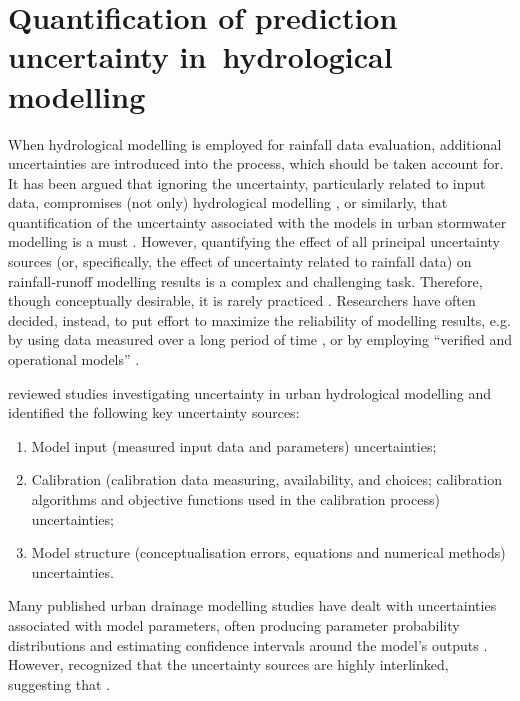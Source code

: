 \documentclass{ctuthesis}\usepackage[]{graphicx}\usepackage[]{color}
\begin{document}
\section{Quantification of prediction uncertainty in~hydrological modelling} \label{PredUncQuant}

When hydrological modelling is employed for rainfall data evaluation, additional uncertainties are introduced into the process, which should be taken account for. It has been argued that ignoring the uncertainty, particularly related to input data, compromises (not only) hydrological modelling \citep{beven2006undermining, kavetskiBayesianAnalysisInput2006}, or similarly, that quantification of the uncertainty associated with the models in urban stormwater modelling is a must \citep{dotto2012comparison}. However, quantifying the effect of all principal uncertainty sources (or, specifically, the effect of
uncertainty related to rainfall data) on rainfall‐runoff modelling results is a complex and challenging
task. Therefore, though conceptually desirable, it is rarely practiced \citep{dotto2012comparison}. Researchers have often decided, instead, to put effort to maximize the reliability of modelling results, e.g. by using data measured over a long period of time \citep{segondSignificanceSpatialRainfall2007}, or by employing “verified and operational models” \citep{ochoa-rodriguezImpactSpatialTemporal2015}.

\cite{deleticAssessingUncertaintiesUrban2012} reviewed studies investigating uncertainty in urban hydrological modelling and identified the following key uncertainty sources:
\begin{enumerate}
        \item Model input (measured input data and parameters) uncertainties;
        \item Calibration (calibration data measuring, availability, and choices; calibration algorithms and objective functions used in the calibration process) uncertainties;
        \item Model structure (conceptualisation errors, equations and numerical methods) uncertainties. 
\end{enumerate}

Many published urban drainage modelling studies have dealt with uncertainties associated with model parameters, often producing parameter probability distributions and estimating confidence intervals around the model’s outputs \citep[e.g.][]{thorndahlEventBasedUncertainty2008, dotto2012comparison}. However, \cite{deleticAssessingUncertaintiesUrban2012} recognized that the uncertainty sources are highly interlinked, suggesting that .
\end{document}

